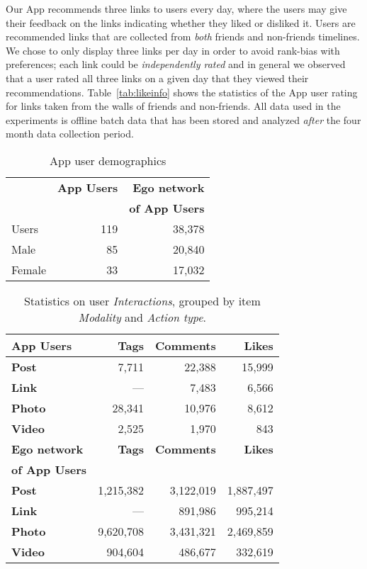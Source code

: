 Our App recommends three links to users every day, where the users may
give their feedback on the links indicating whether they liked or
disliked it. Users are recommended links that are collected
from \emph{both} friends and non-friends timelines.  We chose to only
display three links per day in order to avoid rank-bias with
preferences; each link could be \emph{independently rated} and in
general we observed that a user rated all three links on a given day
that they viewed their recommendations.  Table~\ref{tab:likeinfo}
shows the statistics of the App user rating for links taken from the
walls of friends and non-friends.  All data used in the experiments is
offline batch data that has been stored and analyzed \emph{after} the
four month data collection period.
      							
\begin{table}
\centering
\begin{tabular}{|>{\small}l|>{\small}r|>{\small}r|}
\hline
& \textbf{App Users} & \textbf{Ego network} \\
& & \textbf{of App Users} \\
\hline
Users & 119 & 38,378 \\
\hline
Male & 85 & 20,840 \\
\hline
Female & 33 & 17,032 \\
\hline
\end{tabular}
\caption{App user demographics}
\label{tab:demographics}
\end{table}

\begin{table}
\centering
\begin{tabular}{|>{\small}l|>{\small}r|>{\small}r|>{\small}r|}
\hline
\textbf{App Users} & \textbf{Tags} & \textbf{Comments} & \textbf{Likes} \\
\hline
\textbf{Post} & 7,711 & 22,388 & 15,999 \\
\hline
\textbf{Link}  & --- & 7,483 & 6,566 \\
\hline
\textbf{Photo} & 28,341 & 10,976 & 8,612 \\
\hline
\textbf{Video} & 2,525 & 1,970 & 843 \\
\hline
\hline
\textbf{Ego network} & \textbf{Tags} & \textbf{Comments} & \textbf{Likes} \\
\textbf{of App Users}  & & & \\
\hline
\textbf{Post} & 1,215,382 & 3,122,019 & 1,887,497 \\
\hline
\textbf{Link} & --- & 891,986 & 995,214 \\
\hline
\textbf{Photo} & 9,620,708 & 3,431,321 & 2,469,859 \\
\hline
\textbf{Video} & 904,604 & 486,677 & 332,619 \\
\hline
\end{tabular}
\caption{Statistics on user {\em Interactions}, grouped by item {\em Modality} and {\em Action type}.}
\label{tab:interactions}
\end{table}


